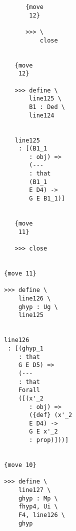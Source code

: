\documentclass[12pt]{article}
\begin{document}
\begin{verbatim}
                                       {move 
                                        12}

                                       >>> \
                                           close


                                    {move 
                                     12}

                                    >>> define \
                                        line125 \
                                        B1 : Ded \
                                        line124


                                    line125 
                                     : [(B1_1 
                                        : obj) => 
                                        (--- 
                                        : that 
                                        (B1_1 
                                        E D4) -> 
                                        G E B1_1)]


                                    {move 
                                     11}

                                    >>> close


                                 {move 11}

                                 >>> define \
                                     line126 \
                                     ghyp : Ug \
                                     line125


                                 line126 
                                  : [(ghyp_1 
                                     : that 
                                     G E D5) => 
                                     (--- 
                                     : that 
                                     Forall 
                                     ([(x'_2 
                                        : obj) => 
                                        ({def} (x'_2 
                                        E D4) -> 
                                        G E x'_2 
                                        : prop)]))]


                                 {move 10}

                                 >>> define \
                                     line127 \
                                     ghyp : Mp \
                                     fhyp4, Ui \
                                     F4, line126 \
                                     ghyp



\end{verbatim}
\end{document}
